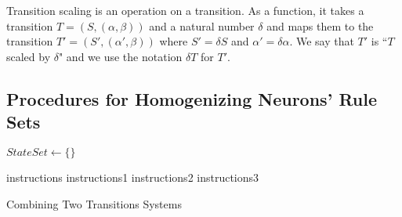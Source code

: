 \documentclass[runningheads,a4paper]{llncs}
\begin{document}
\begin{definition}
Transition scaling is an operation on a transition. As a function, it takes a transition 
$T=(S,(\alpha,\beta))$ and a natural number $\delta$ and maps them to the transition 
$T'=(S',(\alpha',\beta))$ where $S' = \delta S$ and $\alpha' = \delta \alpha$. We say that $T'$
is ``$T$ scaled by $\delta$" and we use the notation $\delta T$ for $T'$.
\end{definition}

\begin{definition}
\end{definition}

\subsection{Procedures for Homogenizing Neurons' Rule Sets}

\begin{definition}
\end{definition}

\begin{definition}
\end{definition}

\begin{definition}
\end{definition}



\begin{algorithm}[H]
\SetAlgoLined
{}


$StateSet \leftarrow \{\}$\;

{
   instructions\;
   {
      instructions1\;
      instructions2\;
   }
   {
      instructions3\;
   }
}
 
\caption{Combining Two Transitions Systems}
\end{algorithm}





\end{document}
